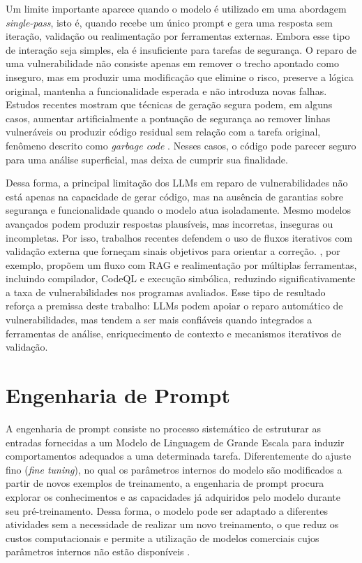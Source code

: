 Um limite importante aparece quando o modelo é utilizado em uma abordagem \textit{single-pass}, isto é, quando recebe um único prompt e gera uma resposta sem iteração, validação ou realimentação por ferramentas externas. Embora esse tipo de interação seja simples, ela é insuficiente para tarefas de segurança. O reparo de uma vulnerabilidade não consiste apenas em remover o trecho apontado como inseguro, mas em produzir uma modificação que elimine o risco, preserve a lógica original, mantenha a funcionalidade esperada e não introduza novas falhas. Estudos recentes mostram que técnicas de geração segura podem, em alguns casos, aumentar artificialmente a pontuação de segurança ao remover linhas vulneráveis ou produzir código residual sem relação com a tarefa original, fenômeno descrito como \textit{garbage code} \cite{dai_rethinking_2025}. Nesses casos, o código pode parecer seguro para uma análise superficial, mas deixa de cumprir sua finalidade.

Dessa forma, a principal limitação dos LLMs em reparo de vulnerabilidades não está apenas na capacidade de gerar código, mas na ausência de garantias sobre segurança e funcionalidade quando o modelo atua isoladamente. Mesmo modelos avançados podem produzir respostas plausíveis, mas incorretas, inseguras ou incompletas. Por isso, trabalhos recentes defendem o uso de fluxos iterativos com validação externa que forneçam sinais objetivos para orientar a correção. \cite{sriram_improving_2026}, por exemplo, propõem um fluxo com RAG e realimentação por múltiplas ferramentas, incluindo compilador, CodeQL e execução simbólica, reduzindo significativamente a taxa de vulnerabilidades nos programas avaliados. Esse tipo de resultado reforça a premissa deste trabalho: LLMs podem apoiar o reparo automático de vulnerabilidades, mas tendem a ser mais confiáveis quando integrados a ferramentas de análise, enriquecimento de contexto e mecanismos iterativos de validação.

\section{Engenharia de Prompt}

A engenharia de prompt consiste no processo sistemático de estruturar as entradas fornecidas a um Modelo de Linguagem de Grande Escala para induzir comportamentos adequados a uma determinada tarefa. Diferentemente do ajuste fino (\textit{fine tuning}), no qual os parâmetros internos do modelo são modificados a partir de novos exemplos de treinamento, a engenharia de prompt procura explorar os conhecimentos e as capacidades já adquiridos pelo modelo durante seu pré-treinamento. Dessa forma, o modelo pode ser adaptado a diferentes atividades sem a necessidade de realizar um novo treinamento, o que reduz os custos computacionais e permite a utilização de modelos comerciais cujos parâmetros internos não estão disponíveis \cite{reynolds_prompt_2021}.

